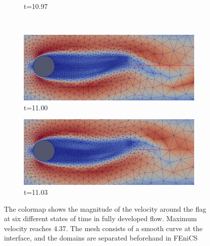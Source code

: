 \begin{center}
\begin{figure}[!ht]
\begin{subfigure}[b]{0.5\linewidth}
\caption{t=10.97}
\end{subfigure} \\
\begin{subfigure}[b]{0.5\linewidth}
\includegraphics[width=\linewidth]{figures/FSI3/coarse/FSI_mesh_5}
\caption{t=11.00}
\end{subfigure}
\begin{subfigure}[b]{0.5\linewidth}
\includegraphics[width=\linewidth]{figures/FSI3/coarse/FSI_mesh_6}
\caption{t=11.03}
\end{subfigure}
\caption{The colormap shows the magnitude of the velocity around the flag at six different states of time in fully developed flow. Maximum velocity reaches 4.37. The mesh consists of a smooth curve at the interface, and the domains are separated beforehand in FEniCS}
\end{figure}
\end{center}




